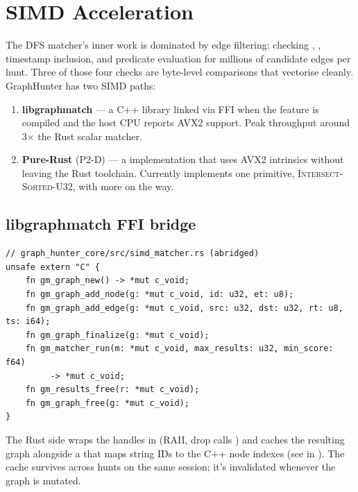 \chapter{SIMD Acceleration}
\label{ch:simd}

The DFS matcher's inner work is dominated by edge filtering:
checking , ,
timestamp inclusion, and predicate evaluation for millions of
candidate edges per hunt. Three of those four checks are
byte-level comparisons that vectorise cleanly. GraphHunter has
two SIMD paths:

\begin{enumerate}
    \item \textbf{libgraphmatch} --- a C++ library linked via FFI
        when the  feature is compiled and the host CPU
        reports AVX2 support. Peak throughput around 3$\times$ the
        Rust scalar matcher.
    \item \textbf{Pure-Rust } (P2-D) --- a
         implementation that uses AVX2
        intrinsics without leaving the Rust toolchain. Currently
        implements one primitive, \textsc{Intersect-Sorted-U32},
        with more on the way.
\end{enumerate}

\section{libgraphmatch FFI bridge}

\begin{lstlisting}[style=rust]
// graph_hunter_core/src/simd_matcher.rs (abridged)
unsafe extern "C" {
    fn gm_graph_new() -> *mut c_void;
    fn gm_graph_add_node(g: *mut c_void, id: u32, et: u8);
    fn gm_graph_add_edge(g: *mut c_void, src: u32, dst: u32, rt: u8, ts: i64);
    fn gm_graph_finalize(g: *mut c_void);
    fn gm_matcher_run(m: *mut c_void, max_results: u32, min_score: f64)
         -> *mut c_void;
    fn gm_results_free(r: *mut c_void);
    fn gm_graph_free(g: *mut c_void);
}
\end{lstlisting}

The Rust side wraps the  handles in
 (RAII, drop calls ) and caches
the resulting graph alongside a  that
maps string IDs to the C++ node indexes (see
 in ). The cache
survives across hunts on the same session; it's invalidated
whenever the graph is mutated.

